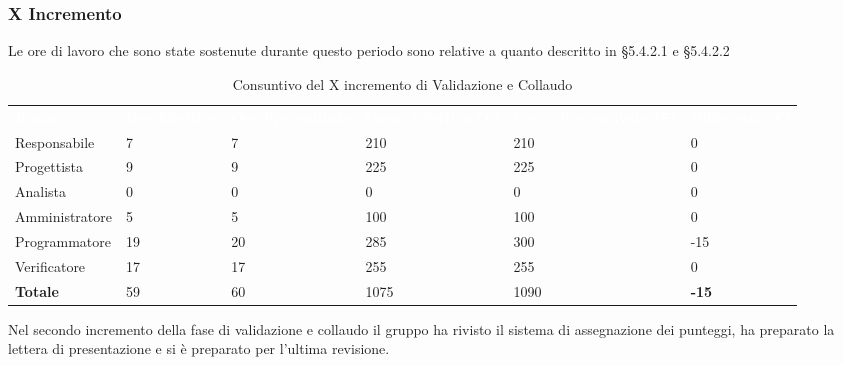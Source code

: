 \pagebreak

\subsubsection{X Incremento}
Le ore di lavoro che sono state sostenute durante questo periodo sono relative a quanto descritto in §5.4.2.1 e §5.4.2.2

\begin{table}[H]
\begin{center}
\renewcommand{\arraystretch}{1.5}
\begin{tabular}{ m{}<{\centering}  m{}<{\centering} m{}<{\centering} m{}<{\centering} m{}<{\centering} m{}<{\centering}}	\rowcolor{darkblue}
	\textcolor{white}{\textbf{Ruolo}} & \textcolor{white}{\textbf{Ore Effettive}} & \textcolor{white}{\textbf{Ore Preventivate}}&\textcolor{white}{\textbf{Costo Effettivo (\euro)}}&\textcolor{white}{\textbf{Costo Preventivato (\euro)}}&\textcolor{white}{\textbf{Differenza (\euro)}}\\ 

	Responsabile  & 7 & 7 & 210 & 210 & 0\\	
	
	Progettista & 9 & 9 & 225 & 225 & 0\\
	
	Analista & 0 & 0 & 0 & 0 & 0\\
	
	Amministratore & 5 & 5 & 100 & 100 & 0\\
	
	Programmatore & 19 & 20 & 285 & 300 & -15\\
	
	Verificatore & 17 & 17 & 255 & 255 & 0\\
	
	\textbf{Totale} & 59 & 60 & 1075 & 1090 & \textbf{-15} \\
	
\end{tabular}
\caption{Consuntivo del X incremento di Validazione e Collaudo}
\end{center}
\end{table}

Nel secondo incremento della fase di validazione e collaudo il gruppo ha rivisto il sistema di assegnazione dei punteggi, ha preparato la lettera di presentazione e si è preparato per l'ultima revisione.

